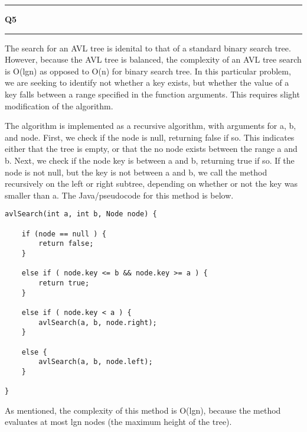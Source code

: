 \documentclass[11pt]{article}
\newcommand\question[2]{\vspace{.25in}\hrule\textbf{#1 #2}\vspace{.5em}\hrule\vspace{.10in}}
\begin{document}
\question{Q5}{}
The search for an AVL tree is idenital to that of a standard binary search tree. However, because the AVL tree is balanced, the complexity of an AVL tree search is O(lgn) as opposed to O(n) for binary search tree. In this particular problem, we are seeking to identify not whether a key exists, but whether the value of a key falls between a range specified in the function arguments. This requires slight modification of the algorithm. 

The algorithm is implemented as a recursive algorithm, with arguments for a, b, and node. First, we check if the node is null, returning false if so. This indicates either that the tree is empty, or that the no node exists between the range a and b. Next, we check if the node key is between a and b, returning true if so. If the node is not null, but the key is not between a and b, we call the method recursively on the left or right subtree, depending on whether or not the key was smaller than a. The Java/pseudocode for this method is below.

\begin{lstlisting}
avlSearch(int a, int b, Node node) {
	
	if (node == null ) {
		return false;
	}

	else if ( node.key <= b && node.key >= a ) {
		return true;
	}

	else if ( node.key < a ) {
		avlSearch(a, b, node.right);
	}

	else {
		avlSearch(a, b, node.left);
	}

}
\end{lstlisting}

As mentioned, the complexity of this method is O(lgn), because the method evaluates at most lgn nodes (the maximum height of the tree).
\end{document}
